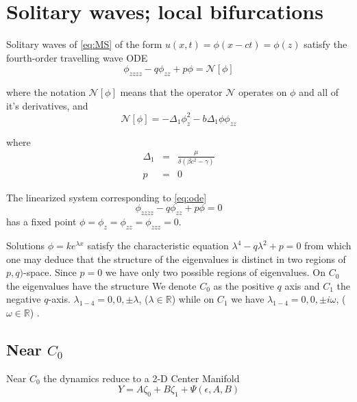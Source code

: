 \section{Solitary waves; local bifurcations}

Solitary waves of \eqref{eq:MS} of the form 
$u(x,t) = \phi\left(x - c t\right) = \phi\left(z\right)$
 satisfy the fourth-order travelling wave ODE
\begin{equation} \label{eq:ode} \phi_{zzzz} - q \phi_{zz} + p \phi = \mathcal{N}[\phi]
\end{equation}

where the notation $\mathcal{N[\phi]}$ means that the operator $\mathcal{N}$ operates on $\phi$ and all of it's derivatives, and 
\begin{equation}
\mathcal{N}\left[\phi\right] = -\Delta_1 \phi_z^2 - b \Delta_1 \phi \phi_{zz}
\end{equation}

where 
\begin{subequations}
\begin{eqnarray}
\Delta_1 &=& \frac{\mu}{ \delta\left( \beta c^2 - \gamma\right) } \\
p &=& 0 
\end{eqnarray}
\end{subequations}

The linearized system corresponding to \eqref{eq:ode}
\begin{equation}
 \label{eq:ode} \phi_{zzzz} - q \phi_{zz} + p \phi = 0
\end{equation}
has a fixed point $\phi = \phi_z = \phi_{zz} = \phi_{zzz} = 0 $.

Solutions $\phi = k e^{\lambda x}$ satisfy the characteristic equation
$\lambda^4 - q \lambda^2 + p = 0 $ from which one may deduce that the structure of the eigenvalues is distinct in two regions of 
$p,q)$-space. Since $p=0$ we have only two
possible regions of eigenvalues. On $C_0$ the eigenvalues have the structure
We denote $C_0$ as the positive $q$ axis and $C_1$ the negative $q$-axis. 
$\lambda_{1-4} = 0,0,\pm \lambda$, ($\lambda \in \mathbb{R}$) while on $C_1$ we
have $\lambda_{1-4} = 0,0,\pm i \omega $, ($\omega \in \mathbb{R} $) .


\subsection{ Near $C_0$ }
Near $C_0$ the dynamics reduce to a 2-D Center Manifold
\begin{equation} Y = A \zeta_0 + B \zeta_1 + \Psi(\epsilon,A,B)
\end{equation}

